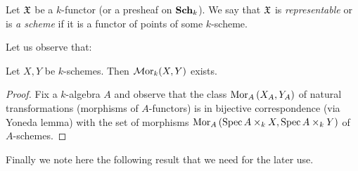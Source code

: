 \begin{definition}
Let ${\mathfrak X}$ be a $k$-functor (or a presheaf on $\mathbf{Sch}_k$). We say that ${\mathfrak X}$ is \textit{representable} or is \textit{a scheme} if it is a functor of points of some $k$-scheme.
\end{definition}
\noindent
Let us observe that:

\begin{fact}\label{fact:internal_hom_exists_for_schemes}
Let $X,Y$ be $k$-schemes. Then $\mathcal{M}\mathrm{or}_k(X,Y)$ exists. 
\end{fact}
\begin{proof}
Fix a $k$-algebra $A$ and observe that the class $\mathrm{Mor}_A\left(X_A,Y_A\right)$ of natural transformations (morphisms of $A$-functors) is in bijective correspondence (via Yoneda lemma) with the set of morphisms $\mathrm{Mor}_A\left(\mathrm{Spec}\, A\times_kX,\mathrm{Spec}\, A\times_kY\right)$ of $A$-schemes.
\end{proof}
\noindent
Finally we note here the following result that we need for the later use.


